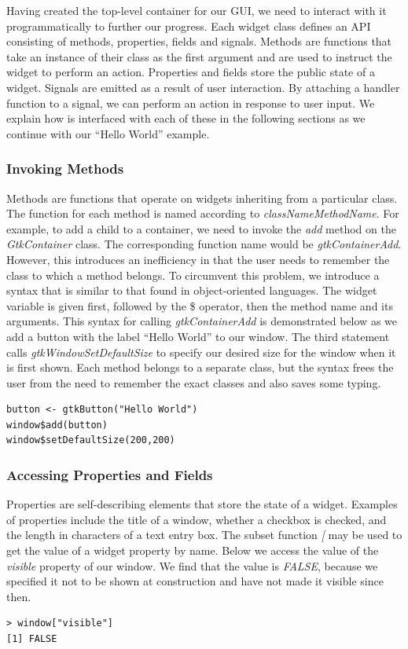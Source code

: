 \documentclass[article]{jss}
\begin{document}
Having created the top-level container for our GUI, we need to interact with it
programmatically to further our progress. Each widget class defines an API 
consisting of methods, properties, fields and signals. Methods are functions 
that take an instance of their class as the first argument and are used to instruct the 
widget to perform an action. Properties and fields store the public state of a widget. 
Signals are emitted as a result of user interaction.
By attaching a handler function to a signal, we can perform an action in response
to user input. We explain how  is interfaced
with each of these in the following sections as we continue with our ``Hello World'' example.

\subsubsection{Invoking Methods}

Methods are functions that operate on widgets inheriting from a particular class.
The  function for each  method is named according to
\emph{classNameMethodName}. For example, to add a child to a container, we 
need to invoke the \emph{add} method on the \emph{GtkContainer} class. 
The corresponding function name would be \emph{gtkContainerAdd}. However, this 
introduces an inefficiency in that the user needs to remember the class to which
a method belongs. To circumvent this problem, we introduce a syntax that is similar
to that found in object-oriented languages. The widget
variable is given first, followed by the \$ operator, then the method
name and its arguments. This syntax for calling \emph{gtkContainerAdd} is demonstrated 
below as we add a button with the label ``Hello World'' to our window. The
third statement calls \emph{gtkWindowSetDefaultSize} to specify our desired
size for the window when it is first shown. Each method belongs to a separate
class, but the syntax frees the user from the need to remember the exact classes
and also saves some typing.
\begin{verbatim}
button <- gtkButton("Hello World")
window$add(button)
window$setDefaultSize(200,200)
\end{verbatim}

\subsubsection{Accessing Properties and Fields}

Properties are self-describing elements that store the state of a widget.
Examples of properties include the title of a window, whether a checkbox is checked, and
the length in characters of a text entry box. The  subset function 
\emph{[} may be used to get the value of a widget property by name.
Below we access the value of the \emph{visible} property of our window. We
find that the value is \emph{FALSE}, because we specified it not to be shown
at construction and have not made it visible since then.
\begin{verbatim}
> window["visible"]
[1] FALSE
\end{verbatim}
\end{document}
